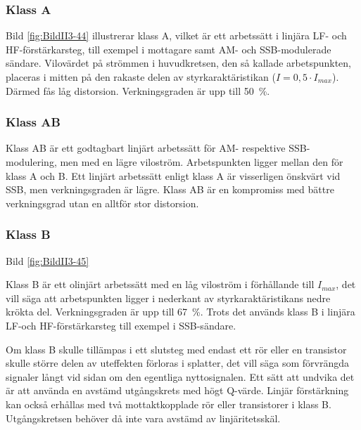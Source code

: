 
\subsubsection{Klass A}

Bild \ref{fig:BildII3-44} illustrerar klass A, vilket är ett arbetssätt i linjära
LF- och HF-förstärkarsteg, till exempel i mottagare samt AM- och SSB-modulerade
sändare.
Vilovärdet på strömmen i huvudkretsen, den så kallade arbetspunkten, placeras i
mitten på den rakaste delen av styrkaraktäristikan (\(I=0,5\cdot I_{max}\)).
Därmed fås låg distorsion.
Verkningsgraden är upp till 50~\%.

\subsubsection{Klass AB}

Klass AB är ett godtagbart linjärt arbetssätt för AM- respektive SSB-modulering,
men med en lägre viloström.
Arbetspunkten ligger mellan den för klass A och B.
Ett linjärt arbetssätt enligt klass A är visserligen önskvärt vid SSB, men
verkningsgraden är lägre.
Klass AB är en kompromiss med bättre verkningsgrad utan en alltför stor
distorsion.

\subsubsection{Klass B}


Bild \ref{fig:BildII3-45}

Klass B är ett olinjärt arbetssätt med en låg viloström i förhållande
till \(I_{max}\), det vill säga att arbetspunkten ligger i nederkant av
styrkaraktäristikans nedre krökta del. Verkningsgraden är upp till
67~\%. Trots det används klass B i linjära LF-och HF-förstärkarsteg
till exempel i SSB-sändare.

Om klass B skulle tillämpas i ett slutsteg med endast ett rör eller en
transistor skulle större delen av uteffekten förloras i splatter,
det vill säga som förvrängda signaler långt vid sidan om den egentliga
nyttosignalen.
Ett sätt att undvika det är att använda en avstämd utgångskrets med högt
Q-värde.
Linjär förstärkning kan också erhållas med två mottaktkopplade rör eller
transistorer i klass B.
Utgångskretsen behöver då inte vara avstämd av linjäritetsskäl.

